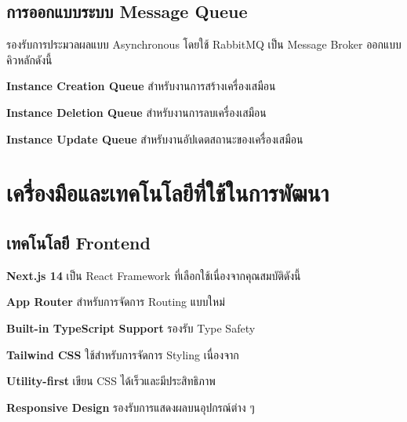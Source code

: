 \subsection{การออกแบบระบบ Message Queue}

\hspace*{1.5em} %
รองรับการประมวลผลแบบ Asynchronous โดยใช้ RabbitMQ เป็น Message Broker ออกแบบคิวหลักดังนี้
\begin{mycustomitem}
    \item \textbf{Instance Creation Queue} สำหรับงานการสร้างเครื่องเสมือน
    \item \textbf{Instance Deletion Queue} สำหรับงานการลบเครื่องเสมือน
    \item \textbf{Instance Update Queue} สำหรับงานอัปเดตสถานะของเครื่องเสมือน
\end{mycustomitem}

\section{เครื่องมือและเทคโนโลยีที่ใช้ในการพัฒนา}

\subsection{เทคโนโลยี Frontend}

\hspace*{1.5em} %
\textbf{Next.js 14} เป็น React Framework ที่เลือกใช้เนื่องจากคุณสมบัติดังนี้
\begin{mycustomitem}
    \item \textbf{App Router} สำหรับการจัดการ Routing แบบใหม่
    \item \textbf{Built-in TypeScript Support} รองรับ Type Safety
\end{mycustomitem}

\hspace*{1.5em} %
\textbf{Tailwind CSS} ใช้สำหรับการจัดการ Styling เนื่องจาก
\begin{mycustomitem}
    \item \textbf{Utility-first} เขียน CSS ได้เร็วและมีประสิทธิภาพ
    \item \textbf{Responsive Design} รองรับการแสดงผลบนอุปกรณ์ต่าง ๆ
\end{mycustomitem}

